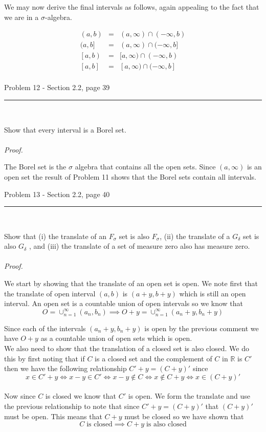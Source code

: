 \documentclass[11pt,reqno]{article}
\begin{document}
We may now derive the final intervals as follows, again appealing to the fact that we are in a $\sigma$-algebra.

\begin{eqnarray*}
(a, b) &=& (a, \infty) \cap (-\infty, b) \\
(a, b] &=& (a, \infty) \cap (-\infty, b] \\
\left[a, b\right) &=& [a, \infty) \cap (-\infty, b) \\
\left[a, b\right] &=& [a, \infty) \cap (-\infty, b] \\
\end{eqnarray*}


\begin{flushleft} 
Problem 12 - Section 2.2, page 39\\
\rule{500pt}{1pt}\\
\end{flushleft} 

Show that every interval is a Borel set.
\\\\ \emph{Proof.}

The Borel set is the $\sigma$ algebra that contains all the open sets. Since $(a, \infty)$ is an open set the result of Problem 11 shows that the Borel sets contain all intervals.

\begin{flushleft} 
Problem 13 - Section 2.2, page 40\\
\rule{500pt}{1pt}\\
\end{flushleft} 

Show that (i) the translate of an $F_\sigma$ set is also $F_\sigma$, (ii) the translate of a $G_\delta$ set is also $G_\delta$ , and (iii) the translate of a set of measure zero also has measure zero.
\\\\ \emph{Proof.}

We start by showing that the translate of an open set is open. We note first that the translate of open interval $(a,b)$ is $(a + y, b + y)$ which is still an open interval. An open set is a countable union of open intervals so we know that 
\[ O = \cup^\infty_{n = 1}(a_n, b_n) \implies  O + y = \cup^\infty_{n = 1}(a_n + y, b_n + y)  \]

Since each of the intervals $(a_n + y, b_n + y)$ is open by the previous comment we have $O +  y$ as a countable union of open sets which is open.\\
\indent We also need to show that the translation of a closed set is also closed. We do this by first noting that if $C$ is a closed set and the complement of $C$ in $\mathbb{R}$ is $C'$ then we have the following relationship $C' + y = (C + y)'$ since
\[ x \in C' + y \iff x - y \in C' \iff x- y \notin C \iff x \notin C + y \iff x \in (C + y)' \] \\
Now since $C$ is closed we know that $C'$ is open. We form the translate and use the previous relationship to note that since $C' + y = (C + y)'$ that $(C + y)'$ must be open. This means that $C+y$ must be closed so we have shown that 
\[ C \; \text{is closed} \implies C + y \; \text{is also closed} \]
\end{document}
